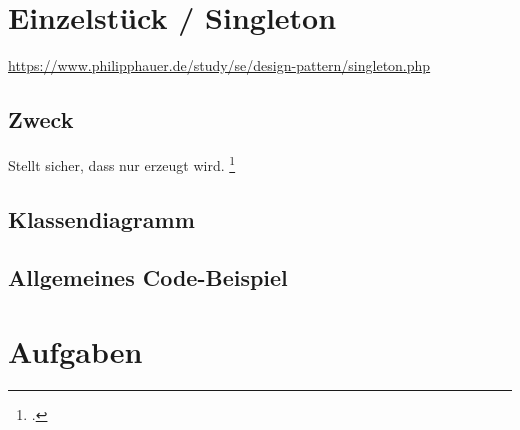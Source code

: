 \documentclass{lehramt-informatik-haupt}
\begin{document}

\chapter{Einzelstück / Singleton}

\begin{quellen}
\item \cite{wiki:singleton}
\item \url{https://www.philipphauer.de/study/se/design-pattern/singleton.php}
\item \cite[Seite 109-115]{gof}
\item \cite[Kapitel 8.3.1, Seite 247-249]{schatten}
\item \cite[Kapitel 3.4 Seite 38-43]{eilebrecht}
\item \cite[Kapitel 1, Seite 1-17]{siebler}
\end{quellen}

\section{Zweck}

Stellt sicher, dass nur  erzeugt
wird.
\footcite[Seite 38]{eilebrecht}

%

\section{Klassendiagramm}


%

\section{Allgemeines Code-Beispiel}



\chapter{Aufgaben}

\literatur
\end{document}

